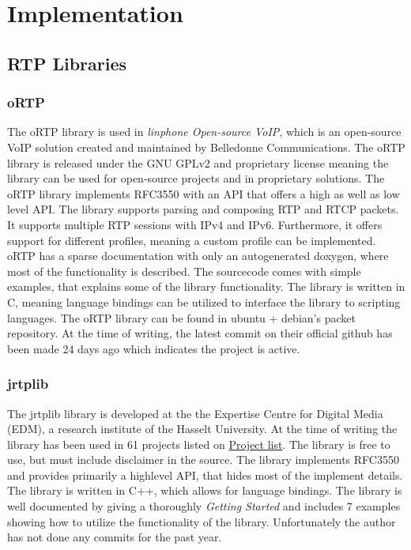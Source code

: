 \chapter{Implementation}

\section{RTP Libraries}
\subsection{oRTP} 
The oRTP library is used in \textit{linphone Open-source VoIP}, which is an open-source VoIP solution created and maintained by Belledonne Communications. The oRTP library is released under the GNU GPLv2 and proprietary license meaning the library can be used for open-source projects and in proprietary solutions.
The oRTP library implements RFC3550 with an API that offers a high as well as low level API. The library supports parsing and composing RTP and RTCP packets. It supports multiple RTP sessions with IPv4 and IPv6. Furthermore, it offers support for different profiles, meaning a custom profile can be implemented.  oRTP has a sparse documentation with only an autogenerated doxygen, where most of the functionality is described. The sourcecode comes with simple examples, that explains some of the library functionality. The library is written in C, meaning language bindings can be utilized to interface the library to scripting languages. The oRTP library can be found in ubuntu + debian's packet repository. At the time of writing, the latest commit on their official github has been made 24 days ago which indicates the project is active.

\subsection{jrtplib}
The jrtplib library is developed at the the Expertise Centre for Digital Media (EDM), a research institute of the Hasselt University. At the time of writing the library has been used in 61 projects listed on \href{http://research.edm.uhasselt.be/jori/cgi-bin/listprojects.py?name=jrtplib}{Project list}. The library is free to use, but must include disclaimer in the source. The library implements RFC3550 and provides primarily a highlevel API, that hides most of the implement details. The library is written in C++, which allows for language bindings. The library is  well documented by giving a thoroughly \textit{Getting Started} and includes 7 examples showing how to utilize the functionality of the library. Unfortunately the author has not done any commits for the past year.

